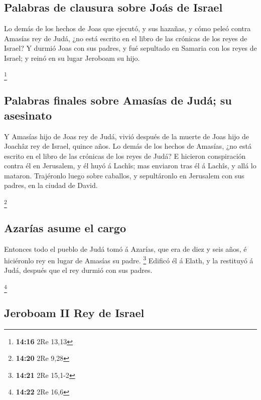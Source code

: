 \hypertarget{palabras-de-clausura-sobre-jouxe1s-de-israel}{%
\subsection{Palabras de clausura sobre Joás de
Israel}\label{palabras-de-clausura-sobre-jouxe1s-de-israel}}

 Lo demás de los hechos de Joas que ejecutó, y sus
hazañas, y cómo peleó contra Amasías rey de Judá, ¿no está escrito en el
libro de las crónicas de los reyes de Israel?  Y durmió
Joas con sus padres, y fué sepultado en Samaria con los reyes de Israel;
y reinó en su lugar Jeroboam su hijo.

\footnote{\textbf{14:16} 2Re 13,13}

\hypertarget{palabras-finales-sobre-amasuxedas-de-juduxe1-su-asesinato}{%
\subsection{Palabras finales sobre Amasías de Judá; su
asesinato}\label{palabras-finales-sobre-amasuxedas-de-juduxe1-su-asesinato}}

 Y Amasías hijo de Joas rey de Judá, vivió después de la
muerte de Joas hijo de Joachâz rey de Israel, quince años.
 Lo demás de los hechos de Amasías, ¿no está escrito en
el libro de las crónicas de los reyes de Judá?  E
hicieron conspiración contra él en Jerusalem, y él huyó á Lachîs; mas
enviaron tras él á Lachîs, y allá lo mataron.  Trajéronlo
luego sobre caballos, y sepultáronlo en Jerusalem con sus padres, en la
ciudad de David.

\footnote{\textbf{14:20} 2Re 9,28}

\hypertarget{azaruxedas-asume-el-cargo}{%
\subsection{Azarías asume el cargo}\label{azaruxedas-asume-el-cargo}}

 Entonces todo el pueblo de Judá tomó á Azarías, que era
de diez y seis años, é hiciéronlo rey en lugar de Amasías su padre.
\footnote{\textbf{14:21} 2Re 15,1-2}  Edificó él á Elath,
y la restituyó á Judá, después que el rey durmió con sus padres.

\footnote{\textbf{14:22} 2Re 16,6}

\hypertarget{jeroboam-ii-rey-de-israel}{%
\subsection{Jeroboam II Rey de Israel}\label{jeroboam-ii-rey-de-israel}}

